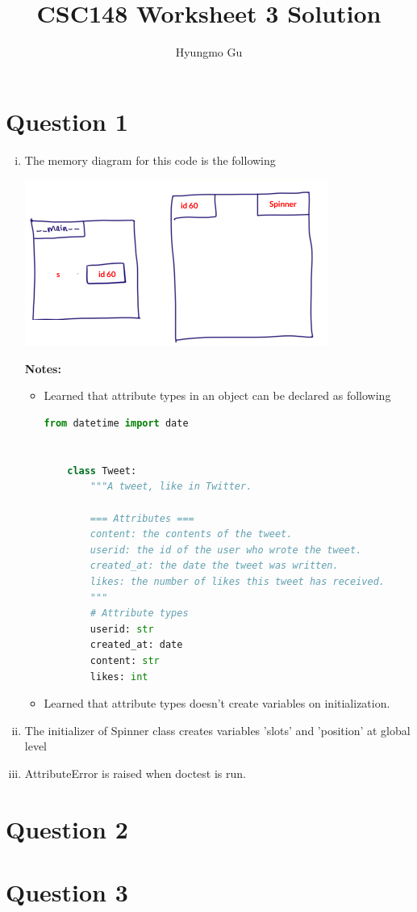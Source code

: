 \documentclass[12pt]{article}
\begin{document}
\title{CSC148 Worksheet 3 Solution}
\author{Hyungmo Gu}
\maketitle

\section*{Question 1}
\begin{enumerate}[i.]
    \item

    The memory diagram for this code is the following

    \begin{center}
    \includegraphics[width=0.7\linewidth]{images/worksheet_3_q1a_solution.png}
    \end{center}

    \bigskip

    \textbf{Notes:}

    \begin{itemize}
    \item Learned that attribute types in an object can be declared as following

    \begin{lstlisting}[language=Python]
    from datetime import date


    class Tweet:
        """A tweet, like in Twitter.

        === Attributes ===
        content: the contents of the tweet.
        userid: the id of the user who wrote the tweet.
        created_at: the date the tweet was written.
        likes: the number of likes this tweet has received.
        """
        # Attribute types
        userid: str
        created_at: date
        content: str
        likes: int
    \end{lstlisting}

    \item Learned that attribute types doesn't create variables on initialization.
    \end{itemize}

    \item The initializer of Spinner class creates variables 'slots' and 'position' at
    global level

    \item AttributeError is raised when doctest is run.
\end{enumerate}

\section*{Question 2}

\section*{Question 3}
\end{document}
